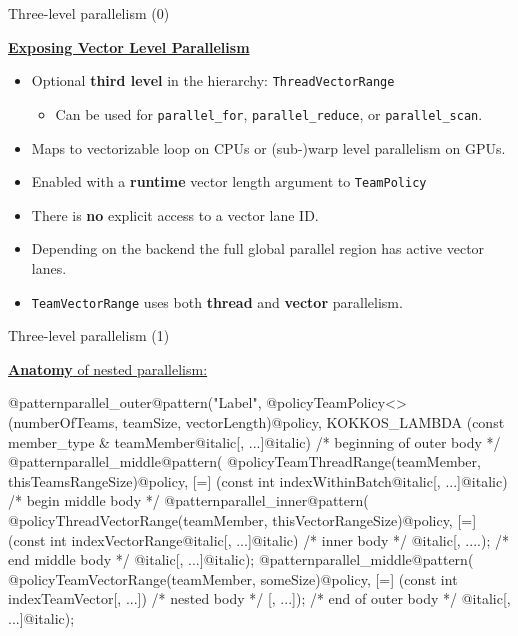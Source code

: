 
\begin{frame}[fragile]{Three-level parallelism (0)}

  \ul{\textbf{Exposing Vector Level Parallelism}}

  \begin{itemize}
    \item{Optional \textbf{third level} in the hierarchy: \texttt{ThreadVectorRange}}
      \begin{itemize}
        \item{Can be used for \texttt{parallel\_for}, \texttt{parallel\_reduce}, or \texttt{parallel\_scan}.}
      \end{itemize}
    \item{Maps to vectorizable loop on CPUs or (sub-)warp level parallelism on GPUs.}
    \item{Enabled with a \textbf{runtime} vector length argument to \texttt{TeamPolicy}}
    \item{There is \textbf{no} explicit access to a vector lane ID.}
    \item{Depending on the backend the full global parallel region has active vector lanes.}
    \item{\texttt{TeamVectorRange} uses both \textbf{thread} and \textbf{vector} parallelism.}
  \end{itemize}


\end{frame}


\begin{frame}[fragile]{Three-level parallelism (1)}

  \ul{\textbf{Anatomy} of nested parallelism:}

  \vspace{-3pt}

  \begin{code}[linebackgroundcolor={
      },
      keywords={}
    ]
@patternparallel_outer@pattern("Label",
  @policyTeamPolicy<>(numberOfTeams, teamSize, vectorLength)@policy,
  KOKKOS_LAMBDA (const member_type & teamMember@italic[, ...]@italic) {
    /* beginning of outer body */
    @patternparallel_middle@pattern(
      @policyTeamThreadRange(teamMember, thisTeamsRangeSize)@policy,
      [=] (const int indexWithinBatch@italic[, ...]@italic) {
        /* begin middle body */
        @patternparallel_inner@pattern(
           @policyThreadVectorRange(teamMember, thisVectorRangeSize)@policy,
           [=] (const int indexVectorRange@italic[, ...]@italic) {
             /* inner body */
           }@italic[, ....);
        /* end middle body */
      }@italic[, ...]@italic);
    @patternparallel_middle@pattern(
    @policyTeamVectorRange(teamMember, someSize)@policy,
      [=] (const int indexTeamVector[, ...]) {
	/* nested body */
      }[, ...]);
    /* end of outer body */
  }@italic[, ...]@italic);
  \end{code}

\end{frame}

